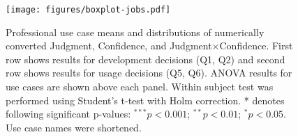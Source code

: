\begin{figure}[!hptb]
    \centering
    \texttt{[image: figures/boxplot-jobs.pdf]}
    \caption{Professional use case means and distributions of numerically converted Judgment, Confidence, and Judgment$\times$Confidence. First row shows results for development decisions (Q1, Q2) and second row shows results for usage decisions (Q5, Q6). ANOVA results for use cases are shown above each panel. Within subject test was performed using Student's t-test with Holm correction. * denotes following significant p-values: $^{***}p<0.001$; $^{**}p<0.01$; $^{*}p<0.05$. Use case names were shortened.}
    \label{fig:use-case-effect-jobs}
\end{figure}